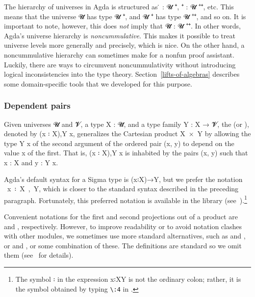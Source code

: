 The hierarchy of universes in Agda is structured as \af ̇ \as : \ab 𝓤 \af ⁺\af ̇, \hskip3mm
 \af ⁺\af ̇ \as : \ab 𝓤 \af ⁺\af ⁺\af ̇, etc. This means that the universe \ab 𝓤\af ̇ has type \ab 𝓤  \af ⁺\af ̇, and 𝓤 \af ⁺\af ̇ has type \ab 𝓤 \af ⁺\af ⁺\af ̇, and so on.  It is important to note, however, this does \emph{not} imply that \ab 𝓤\af ̇ \as : \ab 𝓤 \af ⁺\af ⁺\af ̇. In other words, Agda's universe hierarchy is \emph{noncummulative}. This makes it possible to treat universe levels more generally and precisely, which is nice. On the other hand, a noncummulative hierarchy can sometimes make for a nonfun proof assistant. Luckily, there are ways to circumvent noncummulativity without introducing logical inconsistencies into the type theory. Section~\ref{lifts-of-algebras} describes some domain-specific tools that we developed for this purpose.








\subsubsection{Dependent pairs}\label{ssec:dependent-pairs}
Given universes \ab 𝓤 and \ab 𝓥, a type \ab X \as : \ab 𝓤\aof ̇, and a type family \ab Y \as : X \as → \ab 𝓥\aof ̇, the  (or ), denoted by (\ab x \as ꞉ \ab X)\as ,\ab Y \ab x, generalizes the Cartesian product \ab X~\as ×~\ab Y by allowing the type \ab Y \ab x of the second argument of the ordered pair (\ab x\as , \ab y) to depend on the value \ab x of the first.  That is, (\ab x \as ꞉ \ab X)\as ,\ab Y \ab x is inhabited by the pairs (\ab x\as , \ab y) such that \ab x \as : \ab X and \ab y \as : \ab Y \ab x.

Agda's default syntax for a Sigma type is (\ab x꞉\ab X)\as →\ab Y, but we prefer the notation ~\ab x~꞉~\ab X~,~\ab Y, which is closer to the standard syntax described in the preceding paragraph. Fortunately, this preferred notation is available in the \typetopology library (see~\cite[Σ types]{MHE}).\footnote{The symbol \as ꞉ in the expression \ab x\as ꞉\ab X\AgdaComma{}\ab Y is not the ordinary colon; rather, it is the symbol obtained by typing \texttt{\textbackslash{}:4} in \agdatwomode.} 

\newcommand\FstUnder{\AgdaOperator{\AgdaFunction{∣\AgdaUnderscore{}∣}}\xspace}
\newcommand\SndUnder{\AgdaOperator{\AgdaFunction{∥\AgdaUnderscore{}∥}}\xspace}
Convenient notations for the first and second projections out of a product are \FstUnder and \SndUnder, respectively. However, to improve readability or to avoid notation clashes with other modules, we sometimes use more standard alternatives, such as  and , or  and , or some combination of these. The definitions are standard so we omit them (see~\cite{DeMeo:2021} for details).
